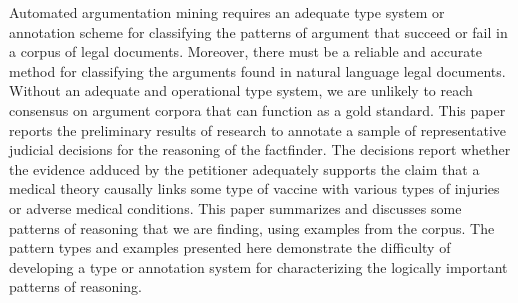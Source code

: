 Automated argumentation mining requires an adequate type system or annotation scheme for classifying the patterns of argument that succeed or fail in a corpus of legal documents. Moreover, there must be a reliable and accurate method for classifying the arguments found in natural language legal documents. Without an adequate and operational type system, we are unlikely to reach consensus on argument corpora that can function as a gold standard. This paper reports the preliminary results of research to annotate a sample of representative judicial decisions for the reasoning of the factfinder. The decisions report whether the evidence adduced by the petitioner adequately supports the claim that a medical theory causally links some type of vaccine with various types of injuries or adverse medical conditions. This paper summarizes and discusses some patterns of reasoning that we are finding, using examples from the corpus. The pattern types and examples presented here demonstrate the difficulty of developing a type or annotation system for characterizing the logically important patterns of reasoning.

